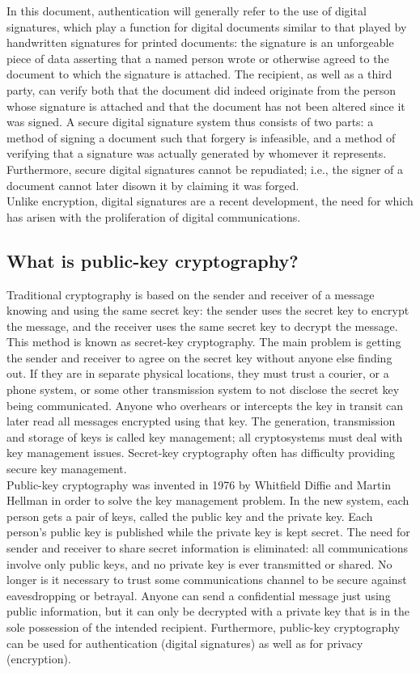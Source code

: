 In this document, authentication will generally refer to the use of
digital signatures, which play a function for digital documents similar
to that played by handwritten signatures for printed documents: the
signature is an unforgeable piece of data asserting that a named person
wrote or otherwise agreed to the document to which the signature is
attached. The recipient, as well as a third party, can verify both that
the document did indeed originate from the person whose signature is
attached and that the document has not been altered since it was
signed. A secure digital signature system thus consists of two parts: a
method of signing a document such that forgery is infeasible, and a
method of verifying that a signature was actually generated by whomever
it represents. Furthermore, secure digital signatures cannot be
repudiated; i.e., the signer of a document cannot later disown it by
claiming it was forged.\\

Unlike encryption, digital signatures are a recent development, the
need for which has arisen with the proliferation of digital
communications.


\subsection{What is public-key cryptography?}
\label{what_pkc}

Traditional cryptography is based on the sender and receiver of a
message knowing and using the same secret key: the sender uses the
secret key to encrypt the message, and the receiver uses the same
secret key to decrypt the message. This method is known as secret-key
cryptography. The main problem is getting the sender and receiver to
agree on the secret key without anyone else finding out. If they are in
separate physical locations, they must trust a courier, or a phone
system, or some other transmission system to not disclose the secret
key being communicated. Anyone who overhears or intercepts the key in
transit can later read all messages encrypted using that key. The
generation, transmission and storage of keys is called key management;
all cryptosystems must deal with key management issues. Secret-key
cryptography often has difficulty providing secure key management.\\

Public-key cryptography was invented in 1976 by Whitfield Diffie and
Martin Hellman in order to solve the key management problem. In the new
system, each person gets a pair of keys, called the public key and the
private key. Each person's public key is published while the private
key is kept secret. The need for sender and receiver to share secret
information is eliminated: all communications involve only public keys,
and no private key is ever transmitted or shared. No longer is it
necessary to trust some communications channel to be secure against
eavesdropping or betrayal. Anyone can send a confidential message just
using public information, but it can only be decrypted with a private
key that is in the sole possession of the intended recipient.
Furthermore, public-key cryptography can be used for authentication
(digital signatures) as well as for privacy (encryption).\\

